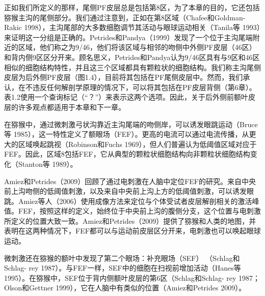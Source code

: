 正如我们所定义的那样，尾侧PF皮层总是包括第8区，为了本章的目的，它还包括猕猴主沟的尾侧部分。我们通过注意到，正如在第8区域（Chafee和Goldman-Rakic 1998），主沟尾部的大多数细胞调节其活动与眼球运动相关（Tanila等 1993）来证明这一分组是正确的。Petrides和Pandya（1999）发现了一个位于主沟尾端附近的区域，他们称之为9/46，他们将该区域与相邻的吻侧中外侧PF皮层（46区）和背内侧9区区分开来。顾名思义，Petrides和Pandya认为9/46区具有与9区和46区相似的细胞结构特性，并且这三个区域都具有颗粒状的细胞结构。我们称主沟尾侧皮层为后外侧PF皮层（图1.4），目前将其包括在PF尾侧皮层中。然而，我们承认，在不违反任何解剖学原理的情况下，可以将其包括在PF皮层背侧（第6章）。表1.2使用一个查询标记（“？”）来表示这两个选项。因此，关于后外侧前额叶皮层的许多观点都适用于本章和下一章。

在猕猴中，通过微刺激弓状沟靠近主沟尾端的吻侧岸，可以诱发眼跳运动（Bruce等 1985），这一特性定义了额眼场（FEF）。更高的电流可以通过电流传播，从更大的区域唤起跳视（Robinson和Fuchs 1969），但人们普遍认为低阈值区域对应于FEF。因此，区域8包括FEF，它从典型的颗粒状细胞结构向非颗粒状细胞结构变化（Stanton等 1989）。

Amiez和Petrides（2009）回顾了通过电刺激在人脑中定位FEF的研究。来自中央前上沟吻侧的低阈值刺激，以及来自中央前上沟上方的低阈值刺激，可以诱发眼跳。Amiez等人（2006）使用成像方法来定位与个体受试者皮层解剖相关的激活峰值。FEF，按照这样的定义，始终位于中央前上沟的腹侧分支，这个位置与电刺激所定义的位置大致一致。Amiez和Petrides（2009）提供了猕猴和人类的地图，并表明在这两种情况下，FEF都可以与运动前皮层区分开来，电刺激也可以唤起眼球运动。

微刺激还在猕猴的额叶中发现了第二个眼场：补充眼场（SEF） （Schlag和Schlag- rey 1987）。与FEF一样，SEF中的细胞在扫视前增加活动（Hanes等 1995）。在猕猴中，SEF位于背内侧额叶皮层的第6区（Schlag和Schlag- rey 1987；Olson和Gettner 1999），它在人脑中有类似的位置（Amiez和Petrides 2009）。
